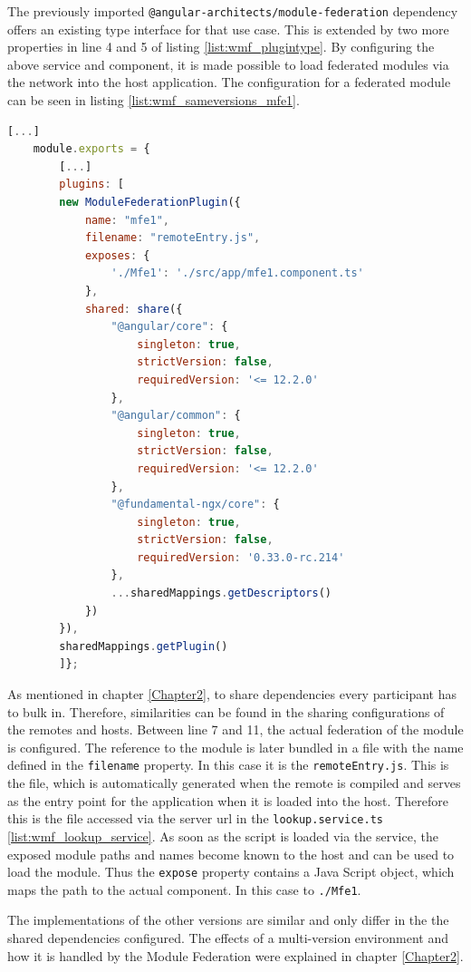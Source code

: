 The previously imported \texttt{@angular-architects/module-federation} dependency offers an existing type interface for that use case. This is extended by two more properties in line 4 and 5 of listing \ref{list:wmf_plugintype}.
By configuring the above service and component, it is made possible to load federated modules via the network into the host application.
The configuration for a federated module can be seen in listing \ref{list:wmf_sameversions_mfe1}.

\begin{lstlisting}[language=JavaScript, caption=Content of \texttt{webpack.config.js} of the mfe1 remote app of the same versions WMF project, label=list:wmf_sameversions_mfe1,  xleftmargin=.01\textwidth, xrightmargin=.01\textwidth]
	[...]
	module.exports = {
		[...]
		plugins: [
		new ModuleFederationPlugin({
			name: "mfe1",
			filename: "remoteEntry.js",
			exposes: {
				'./Mfe1': './src/app/mfe1.component.ts'
			},
			shared: share({
				"@angular/core": { 
					singleton: true, 
					strictVersion: false, 
					requiredVersion: '<= 12.2.0' 
				},
				"@angular/common": { 
					singleton: true, 
					strictVersion: false, 
					requiredVersion: '<= 12.2.0' 
				},
				"@fundamental-ngx/core": { 
					singleton: true, 
					strictVersion: false,
					requiredVersion: '0.33.0-rc.214' 
				},
				...sharedMappings.getDescriptors()
			})
		}),
		sharedMappings.getPlugin()
		]};
\end{lstlisting}

As mentioned in chapter \ref{Chapter2}, to share dependencies every participant has to bulk in. Therefore, similarities can be found in the sharing configurations of the remotes and hosts. 
Between line 7 and 11, the actual federation of the module is configured. The reference to the module is later bundled in a file with the name defined in the \texttt{filename} property. In this case it is the \texttt{remoteEntry.js}.
This is the file, which is automatically generated when the remote is compiled and serves as the entry point for the application when it is loaded into the host. Therefore this is the file accessed via the server url in the \texttt{lookup.service.ts} \ref{list:wmf_lookup_service}.
As soon as the script is loaded via the service, the exposed module paths and names become known to the host and can be used to load the module. Thus the \texttt{expose} property contains a Java Script object, which maps the path to the actual component. In this case to \texttt{./Mfe1}.\cite{wmf_concepts}

The implementations of the other versions are similar and only differ in the the shared dependencies configured. The effects of a multi-version environment and how it is handled by the Module Federation were explained in chapter \ref{Chapter2}.
